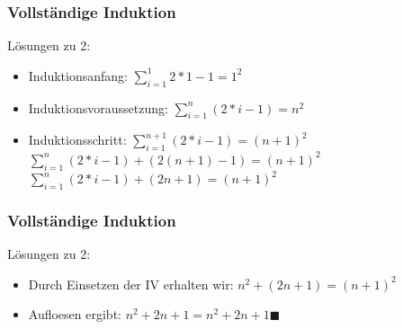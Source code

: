 \begin{frame}
    \frametitle{Vollständige Induktion}
    Lösungen zu 2:
        \begin{itemize}
            \vfill \item Induktionsanfang:
            \newline $\sum_{i=1}^{1} 2*1-1 = 1^2$
            \vfill \item Induktionsvoraussetzung:
            \newline $\sum_{i=1}^{n} (2*i-1) = n^2$
            \vfill \item Induktionsschritt:
            \newline $\sum_{i=1}^{n+1} (2*i-1) = (n+1)^2$
            \newline $\sum_{i=1}^{n} (2*i-1)+(2(n+1)-1) = (n+1)^2$
            \newline $\sum_{i=1}^{n} (2*i-1)+(2n+1) = (n+1)^2$
        \end{itemize}

\end{frame}

\begin{frame}
    \frametitle{Vollständige Induktion}
    Lösungen zu 2:
        \begin{itemize}
            \vfill \item Durch Einsetzen der IV erhalten wir:
            \newline $n^2+(2n+1) = (n+1)^2$
            \vfill \item Aufloesen ergibt:
            \newline $n^2+2n+1 = n^2 + 2n + 1 \blacksquare$
        \end{itemize}
		
\end{frame}
